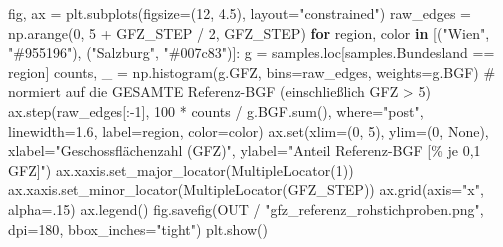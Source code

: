 \documentclass[
  ngerman,
  a4paper,
  DIV=11]{scrreprt}
\newenvironment{Shaded}{\begin{snugshade}}{\end{snugshade}}
\newcommand{\BuiltInTok}[1]{\textcolor[rgb]{0.00,0.23,0.31}{#1}}
\newcommand{\CommentTok}[1]{\textcolor[rgb]{0.37,0.37,0.37}{#1}}
\newcommand{\ControlFlowTok}[1]{\textcolor[rgb]{0.00,0.23,0.31}{\textbf{#1}}}
\newcommand{\DecValTok}[1]{\textcolor[rgb]{0.68,0.00,0.00}{#1}}
\newcommand{\FloatTok}[1]{\textcolor[rgb]{0.68,0.00,0.00}{#1}}
\newcommand{\KeywordTok}[1]{\textcolor[rgb]{0.00,0.23,0.31}{\textbf{#1}}}
\newcommand{\NormalTok}[1]{\textcolor[rgb]{0.00,0.23,0.31}{#1}}
\newcommand{\OperatorTok}[1]{\textcolor[rgb]{0.37,0.37,0.37}{#1}}
\newcommand{\StringTok}[1]{\textcolor[rgb]{0.13,0.47,0.30}{#1}}
\newcommand{\VariableTok}[1]{\textcolor[rgb]{0.07,0.07,0.07}{#1}}
\begin{document}
\begin{Shaded}
\begin{Highlighting}[]
\NormalTok{fig, ax }\OperatorTok{=}\NormalTok{ plt.subplots(figsize}\OperatorTok{=}\NormalTok{(}\DecValTok{12}\NormalTok{, }\FloatTok{4.5}\NormalTok{), layout}\OperatorTok{=}\StringTok{"constrained"}\NormalTok{)}
\NormalTok{raw\_edges }\OperatorTok{=}\NormalTok{ np.arange(}\DecValTok{0}\NormalTok{, }\DecValTok{5} \OperatorTok{+}\NormalTok{ GFZ\_STEP }\OperatorTok{/} \DecValTok{2}\NormalTok{, GFZ\_STEP)}
\ControlFlowTok{for}\NormalTok{ region, color }\KeywordTok{in}\NormalTok{ [(}\StringTok{"Wien"}\NormalTok{, }\StringTok{"\#955196"}\NormalTok{), (}\StringTok{"Salzburg"}\NormalTok{, }\StringTok{"\#007c83"}\NormalTok{)]:}
\NormalTok{    g }\OperatorTok{=}\NormalTok{ samples.loc[samples.Bundesland }\OperatorTok{==}\NormalTok{ region]}
\NormalTok{    counts, \_ }\OperatorTok{=}\NormalTok{ np.histogram(g.GFZ, bins}\OperatorTok{=}\NormalTok{raw\_edges, weights}\OperatorTok{=}\NormalTok{g.BGF)}
    \CommentTok{\# normiert auf die GESAMTE Referenz{-}BGF (einschließlich GFZ \textgreater{} 5)}
\NormalTok{    ax.step(raw\_edges[:}\OperatorTok{{-}}\DecValTok{1}\NormalTok{], }\DecValTok{100} \OperatorTok{*}\NormalTok{ counts }\OperatorTok{/}\NormalTok{ g.BGF.}\BuiltInTok{sum}\NormalTok{(), where}\OperatorTok{=}\StringTok{"post"}\NormalTok{,}
\NormalTok{            linewidth}\OperatorTok{=}\FloatTok{1.6}\NormalTok{, label}\OperatorTok{=}\NormalTok{region, color}\OperatorTok{=}\NormalTok{color)}
\NormalTok{ax.}\BuiltInTok{set}\NormalTok{(xlim}\OperatorTok{=}\NormalTok{(}\DecValTok{0}\NormalTok{, }\DecValTok{5}\NormalTok{), ylim}\OperatorTok{=}\NormalTok{(}\DecValTok{0}\NormalTok{, }\VariableTok{None}\NormalTok{), xlabel}\OperatorTok{=}\StringTok{"Geschossflächenzahl (GFZ)"}\NormalTok{,}
\NormalTok{       ylabel}\OperatorTok{=}\StringTok{"Anteil Referenz{-}BGF [\% je 0,1 GFZ]"}\NormalTok{)}
\NormalTok{ax.xaxis.set\_major\_locator(MultipleLocator(}\DecValTok{1}\NormalTok{))}
\NormalTok{ax.xaxis.set\_minor\_locator(MultipleLocator(GFZ\_STEP))}
\NormalTok{ax.grid(axis}\OperatorTok{=}\StringTok{"x"}\NormalTok{, alpha}\OperatorTok{=}\FloatTok{.15}\NormalTok{)}
\NormalTok{ax.legend()}
\NormalTok{fig.savefig(OUT }\OperatorTok{/} \StringTok{"gfz\_referenz\_rohstichproben.png"}\NormalTok{, dpi}\OperatorTok{=}\DecValTok{180}\NormalTok{, bbox\_inches}\OperatorTok{=}\StringTok{"tight"}\NormalTok{)}
\NormalTok{plt.show()}
\end{Highlighting}
\end{Shaded}
\end{document}
